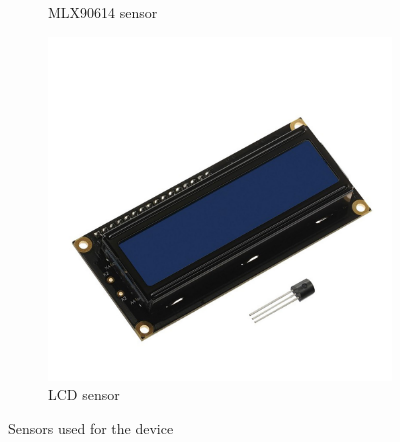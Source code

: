\documentclass[10pt, conference]{IEEEtran}
\begin{document}
\begin{figure}[t]
\begin{subfigure}[b]{.3\linewidth}
        \caption{MLX90614 sensor}
        \label{fig:thermometer}
    \end{subfigure}%
    \begin{subfigure}[b]{.3\linewidth}
        \centering
        \includegraphics[width=\linewidth]{resources/LCD.jpg}
        \caption{LCD sensor}
        \label{fig:LCD}
    \end{subfigure}
    \label{fig:sensors}
    \caption{Sensors used for the device}
\end{figure}
\end{document}
